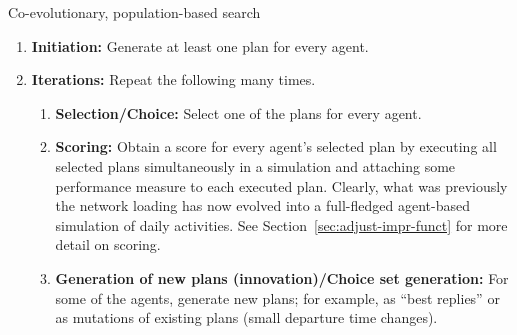 \begin{algorithm}[H]

\caption{Co-evolutionary, population-based search}

\begin{enumerate}
\item \textbf{Initiation:} Generate at least one plan for every
  agent. 

\item \textbf{Iterations:} Repeat the following many times.

\begin{enumerate}

\item \textbf{Selection/Choice:} Select one of the plans for every agent.

\item \textbf{Scoring:} Obtain a score for every agent's selected
  plan by executing all selected plans simultaneously
  in a simulation and attaching some performance measure to each
  executed plan.  Clearly, what was previously the network loading has now
  evolved into a full-fledged agent-based simulation of daily
  activities.  See Section~\ref{sec:adjust-impr-funct} for more detail on
 scoring.

\item \textbf{Generation of new plans (innovation)/Choice set
  generation:} For some of the agents, generate new plans; for
  example, as ``best replies'' or as mutations of existing plans
  (\eg small departure time changes).

\end{enumerate} %

\end{enumerate}

\end{algorithm}

% 
% 

